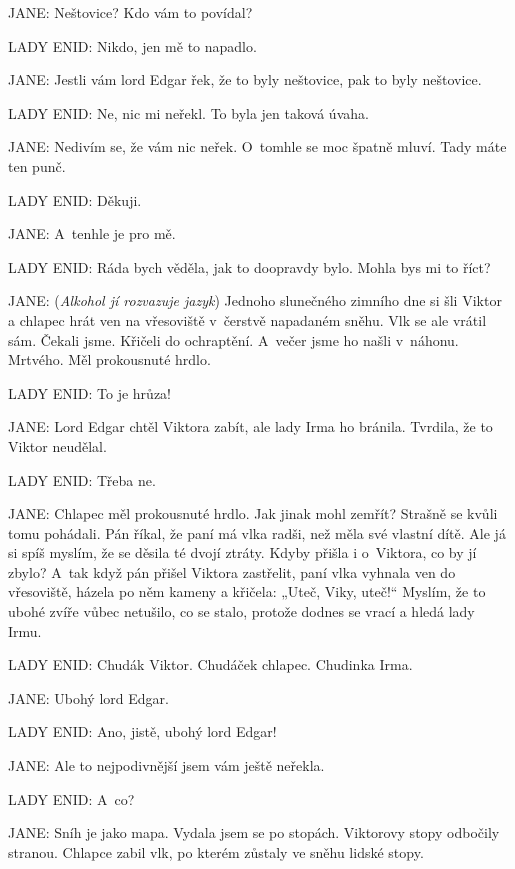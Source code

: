 \noindent
JANE: Neštovice? Kdo vám to povídal?

\noindent
LADY ENID: Nikdo, jen mě to napadlo.

\noindent
JANE: Jestli vám lord Edgar řek, že to byly neštovice, pak to byly neštovice.

\noindent
LADY ENID: Ne, nic mi neřekl. To byla jen taková úvaha.

\noindent
JANE: Nedivím se, že vám nic neřek. O~tomhle se moc špatně mluví. Tady máte ten punč.

\noindent
LADY ENID: Děkuji.

\noindent
JANE: A~tenhle je pro mě.

\noindent
LADY ENID: Ráda bych věděla, jak to doopravdy bylo. Mohla bys mi to říct?

\noindent
JANE: (\textit{Alkohol jí rozvazuje jazyk}) Jednoho slunečného zimního dne si šli Viktor a chlapec hrát ven na vřesoviště v čerstvě napadaném sněhu. Vlk se ale vrátil sám. Čekali jsme. Křičeli do ochraptění. A~večer jsme ho našli v náhonu. Mrtvého. Měl prokousnuté hrdlo.

\noindent
LADY ENID: To je hrůza!

\noindent
JANE: Lord Edgar chtěl Viktora zabít, ale lady Irma ho bránila. Tvrdila, že to Viktor neudělal.

\noindent
LADY ENID: Třeba ne.

\noindent
JANE: Chlapec měl prokousnuté hrdlo. Jak jinak mohl zemřít? Strašně se kvůli tomu pohádali. Pán říkal, že paní má vlka radši, než měla své vlastní dítě. Ale já si spíš myslím, že se děsila té dvojí ztráty. Kdyby přišla i o~Viktora, co by jí zbylo? A~tak když pán přišel Viktora zastřelit, paní vlka vyhnala ven do vřesoviště, házela po něm kameny a křičela: „Uteč, Viky, uteč!“ Myslím, že to ubohé zvíře vůbec netušilo, co se stalo, protože dodnes se vrací a hledá lady Irmu.

\noindent
LADY ENID: Chudák Viktor. Chudáček chlapec. Chudinka Irma.

\noindent
JANE: Ubohý lord Edgar.

\noindent
LADY ENID: Ano, jistě, ubohý lord Edgar!

\noindent
JANE: Ale to nejpodivnější jsem vám ještě neřekla.

\noindent
LADY ENID: A~co?

\noindent
JANE: Sníh je jako mapa. Vydala jsem se po stopách. Viktorovy stopy odbočily stranou. Chlapce zabil vlk, po kterém zůstaly ve sněhu lidské stopy.

